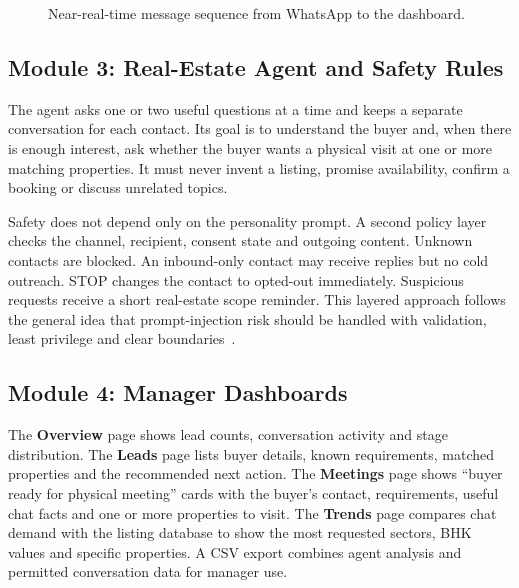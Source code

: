 \documentclass{tietreport}
\begin{document}
\begin{figure}[H]
\centering
{}
\caption{Near-real-time message sequence from WhatsApp to the dashboard.}
\label{fig:realtime}
\end{figure}
\FloatBarrier

\subsection{Module 3: Real-Estate Agent and Safety Rules}

The agent asks one or two useful questions at a time and keeps a separate
conversation for each contact. Its goal is to understand the buyer and, when
there is enough interest, ask whether the buyer wants a physical visit at one or
more matching properties. It must never invent a listing, promise availability,
confirm a booking or discuss unrelated topics.

Safety does not depend only on the personality prompt. A second policy layer
checks the channel, recipient, consent state and outgoing content. Unknown
contacts are blocked. An inbound-only contact may receive replies but no cold
outreach. STOP changes the contact to opted-out immediately. Suspicious requests
receive a short real-estate scope reminder. This layered approach follows the
general idea that prompt-injection risk should be handled with validation,
least privilege and clear boundaries~\cite{owaspllm}.

\subsection{Module 4: Manager Dashboards}

The \textbf{Overview} page shows lead counts, conversation activity and stage
distribution. The \textbf{Leads} page lists buyer details, known requirements,
matched properties and the recommended next action. The \textbf{Meetings} page
shows ``buyer ready for physical meeting'' cards with the buyer's contact,
requirements, useful chat facts and one or more properties to visit. The
\textbf{Trends} page compares chat demand with the listing database to show the
most requested sectors, BHK values and specific properties. A CSV export combines
agent analysis and permitted conversation data for manager use.
\end{document}
